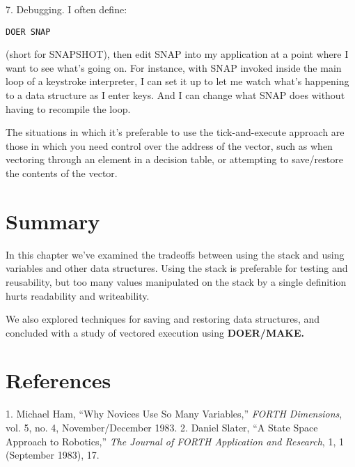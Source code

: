 7. Debugging. I often define:

\begin{verbatim}
DOER SNAP
\end{verbatim}

(short for SNAPSHOT), then edit SNAP into my application at a point
where I want to see what's going on. For instance, with SNAP invoked inside
the main loop of a keystroke interpreter, I can set it up to let me watch
what's happening to a data structure as I enter keys. And I can change
what SNAP does without having to recompile the loop.


The situations in which it's preferable to use the tick-and-execute approach
are those in which you need control over the address of the vector,
such as when vectoring through an element in a decision table, or
attempting to save/restore the contents of the vector.

\section{Summary}

In this chapter we've examined the tradeoffs between using the stack
and using variables and other data structures. Using the stack is
preferable for testing and reusability, but too many values manipulated
on the stack by a single definition hurts readability and writeability.

We also explored techniques for saving and restoring data structures,
and concluded with a study of vectored execution using \bf{DOER}/\bf{MAKE}.

\section{References}

1. Michael Ham, ``Why Novices Use So Many Variables,'' \emph{FORTH
   Dimensions}, vol. 5, no. 4, November/December 1983.
2. Daniel Slater, ``A State Space Approach to Robotics,'' \emph{The Journal
   of FORTH Application and Research}, 1, 1 (September 1983), 17.

